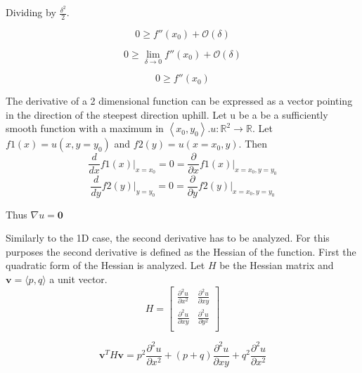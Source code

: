 \documentclass{article}
\begin{document}
Dividing by $\frac{\delta^2}{2}$.

\begin{equation}
    0 \geq f''(x_{0}) + \mathcal{O}(\delta)
\end{equation}

\begin{equation}
    0 \geq \lim_{\delta \to 0} f''(x_{0}) + \mathcal{O}(\delta)
\end{equation}

\begin{equation}
    0 \geq f''(x_{0})
\end{equation}

The derivative of a 2 dimensional function can be expressed as a vector pointing in the direction of the steepest direction uphill.
Let u be a be a sufficiently smooth function with a maximum in $ \left<x_{0}, y_{0}\right> $.$ u: \mathbb{R}^{2} \to \mathbb{R} $.
Let $f1(x) = u(x,y=y_{0})$ and $f2(y) = u(x=x_{0},y)$. Then
\begin{equation}
    \frac{d}{dx}f1(x)\bigg|_{x=x_{0}} = 0 = \frac{\partial}{\partial x}f1(x)\bigg|_{x=x_{0},y=y_{0}}
\end{equation}{}
\begin{equation}
    \frac{d}{dy}f2(y)\bigg|_{y=y_{0}} = 0 = \frac{\partial}{\partial y}f2(y)\bigg|_{x=x_{0},y=y_{0}}
\end{equation}{}

Thus $\nabla u = \mathbf{0}$

Similarly to the 1D case, the second derivative has to be analyzed. For this purposes the second derivative is defined as the Hessian of the function.
First the quadratic form of the Hessian is analyzed. Let $H$ be the Hessian matrix and $\mathbf{v}=\langle p, q\rangle$ a unit vector.
\begin{equation}
 H = \begin{bmatrix}
      \frac{\partial^2 u}{\partial x^2} & \frac{\partial^2 u}{\partial xy}\\
      \frac{\partial^2 u}{\partial xy} & \frac{\partial^2 u}{\partial y^2}\\
    \end{bmatrix}
\end{equation}

\begin{equation}
\mathbf{v}^{T} H \mathbf{v}= p^2\frac{\partial^2 u}{\partial x^2}+(p+q)\frac{\partial^2 u}{\partial xy} +q^2\frac{\partial^2 u}{\partial x^2}
\end{equation}
\end{document}
